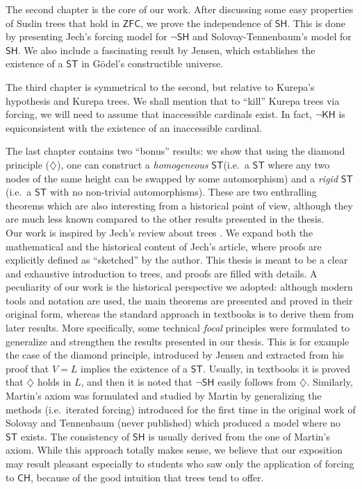 \documentclass[11pt,a4paper]{report}
\theoremstyle{definition}
\theoremstyle{num.custom-title}
\theoremstyle{custom-title}
\newcommand{\ZFC}{\ensuremath{\mathsf{ZFC}}\xspace}
\newcommand{\CH}{\ensuremath{\mathsf{CH}}\xspace}
\newcommand{\SH}{\ensuremath{\mathsf{SH}}\xspace}
\newcommand{\nSH}{\ensuremath{\neg\mathsf{SH}}\xspace}
\newcommand{\ST}{\ensuremath{\mathsf{ST}}\xspace}
\newcommand{\KH}{\ensuremath{\mathsf{KH}}\xspace}
\begin{document}
The second chapter is the core of our work. After discussing some easy properties of Suslin trees that hold in \ZFC, we prove the independence of \SH. This is done by presenting Jech's forcing model for \nSH and Solovay-Tennenbaum's model for \SH. We also include a fascinating result by Jensen, which establishes the existence of a \ST in Gödel's constructible universe.

The third chapter is symmetrical to the second, but relative to Kurepa's hypothesis and Kurepa trees. We shall mention that to ``kill'' Kurepa trees via forcing, we will need to assume that inaccessible cardinals exist. In fact, $\neg\KH$ is equiconsistent with the existence of an inaccessible cardinal.

The last chapter contains two ``bonus'' results: we show that using the diamond principle ($\diamondsuit$), one can construct a \emph{homogeneous} \ST (i.e.\ a \ST where any two nodes of the same height can be swapped by some automorphism) and a \emph{rigid} \ST (i.e.\ a \ST with no non-trivial automorphisms). These are two enthralling theorems which are also interesting from a historical point of view, although they are much less known compared to the other results presented in the thesis.
\\[10pt]
\indent Our work is inspired by Jech's review about trees \cite{Jec1971}. We expand both the mathematical and the historical content of Jech's article, where proofs are explicitly defined as ``sketched'' by the author. This thesis is meant to be a clear and exhaustive introduction to trees, and proofs are filled with details. A peculiarity of our work is the historical perspective we adopted: although modern tools and notation are used, the main theorems are presented and proved in their original form, whereas the standard approach in textbooks is to derive them from later results. More specifically, some technical \emph{focal} principles were formulated to generalize and strengthen the results presented in our thesis. This is for example the case of the diamond principle, introduced by Jensen and extracted from his proof that $V=L$ implies the existence of a \ST. Usually, in textbooks it is proved that $\diamondsuit$ holds in $L$, and then it is noted that $\nSH$ easily follows from $\diamondsuit$. Similarly, Martin's axiom was formulated and studied by Martin by generalizing the methods (i.e.\ iterated forcing) introduced for the first time in the original work of Solovay and Tennenbaum (never published) which produced a model where no \ST exists. The consistency of \SH is usually derived from the one of Martin's axiom. While this approach totally makes sense, we believe that our exposition may result pleasant especially to students who saw only the application of forcing to \CH, because of the good intuition that trees tend to offer.
\end{document}
